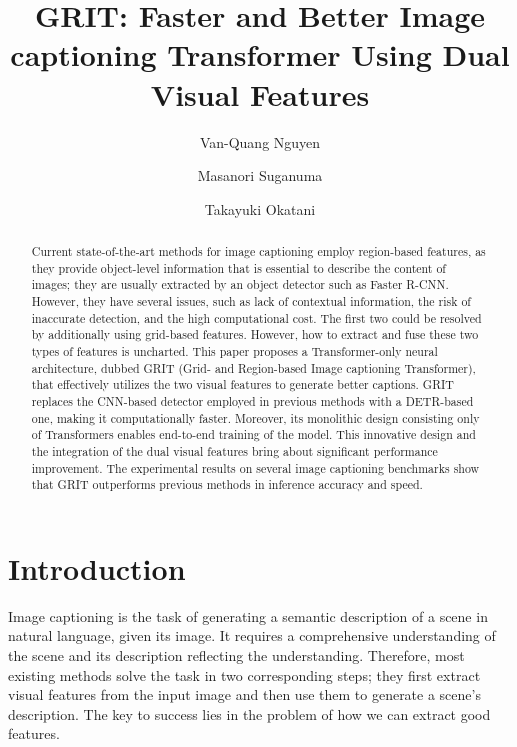 \documentclass[runningheads]{llncs}
\begin{document}
\pagestyle{headings}
\mainmatter
\def\ECCVSubNumber{2605}  

\title{
GRIT: Faster and Better Image captioning Transformer Using Dual Visual Features}


\author{Van-Quang Nguyen\and
Masanori Suganuma\and
Takayuki Okatani}
\maketitle

\begin{abstract}
Current state-of-the-art methods for image captioning employ region-based features, as they provide object-level information that is essential to describe the content of images; they are usually extracted by an object detector such as Faster R-CNN. However, they have several issues, such as lack of contextual information, the risk of inaccurate detection, and the high computational cost. The first two could be resolved by additionally using grid-based features. However, how to extract and fuse these two types of features is uncharted. This paper proposes a Transformer-only neural architecture, dubbed GRIT (Grid- and Region-based Image captioning Transformer), that effectively utilizes the two visual features to generate better captions. GRIT replaces the CNN-based detector employed in previous methods with a DETR-based one, making it computationally faster. Moreover, its monolithic design consisting only of Transformers enables end-to-end training of the model. This innovative design and the integration of the dual visual features bring about significant performance improvement. The experimental results on several image captioning benchmarks show that GRIT outperforms previous methods in inference accuracy and speed.
\end{abstract}


\section{Introduction}

Image captioning is the task of generating a semantic description of a scene in natural language, given its image. It requires a comprehensive understanding of the scene and its description reflecting the understanding. Therefore, most existing methods solve the task in two corresponding steps; they first extract visual features from the input image and then use them to generate a scene's description. The key to success lies in the problem of how we can extract good features. 
\end{document}
